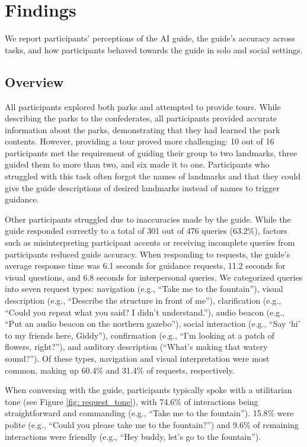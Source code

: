 \section{Findings}

We report participants’ perceptions of the AI guide, the guide’s accuracy across tasks, and how participants behaved towards the guide in solo and social settings.

\subsection{Overview}
All participants explored both parks and attempted to provide tours. While describing the parks to the confederates, all participants provided accurate information about the parks, demonstrating that they had learned the park contents. However, providing a tour proved more challenging: 10 out of 16 participants met the requirement of guiding their group to two landmarks, three guided them to more than two, and six made it to one. Participants who struggled with this task often forgot the names of landmarks and that they could give the guide descriptions of desired landmarks instead of names to trigger guidance.

Other participants struggled due to inaccuracies made by the guide. While the guide responded correctly to a total of 301 out of 476 queries (63.2\%), factors such as misinterpreting participant accents or receiving incomplete queries from participants reduced guide accuracy. When responding to requests, the guide’s average response time was 6.1 seconds for guidance requests, 11.2 seconds for visual questions, and 6.8 seconds for interpersonal queries.  We categorized queries into seven request types: navigation (e.g., “Take me to the fountain”), visual description (e.g., “Describe the structure in front of me”), clarification (e.g., “Could you repeat what you said? I didn’t understand.”), audio beacon (e.g., “Put an audio beacon on the northern gazebo”), social interaction (e.g., “Say ‘hi’ to my friends here, Giddy”), confirmation (e.g., “I’m looking at a patch of flowers, right?”), and auditory description (“What’s making that watery sound?”). Of these types, navigation and visual interpretation were most common, making up 60.4\% and 31.4\% of requests, respectively.

When conversing with the guide, participants typically spoke with a utilitarian tone (see Figure \ref{fig: request_tone}), with 74.6\% of interactions being straightforward and commanding (e.g., “Take me to the fountain”). 15.8\% were polite (e.g., “Could you please take me to the fountain?”) and 9.6\% of remaining interactions were friendly (e.g., “Hey buddy, let’s go to the fountain”).

